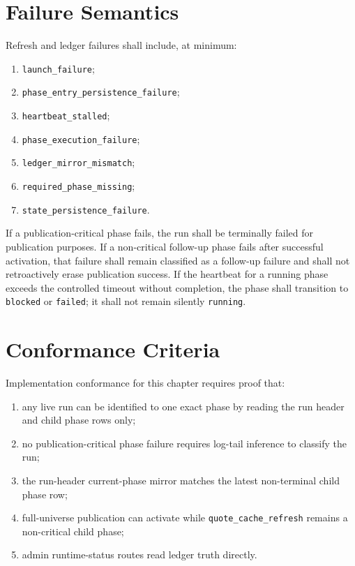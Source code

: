\section{Failure Semantics}
Refresh and ledger failures shall include, at minimum:
\begin{enumerate}[leftmargin=1.2cm]
    \item \texttt{launch\_failure};
    \item \texttt{phase\_entry\_persistence\_failure};
    \item \texttt{heartbeat\_stalled};
    \item \texttt{phase\_execution\_failure};
    \item \texttt{ledger\_mirror\_mismatch};
    \item \texttt{required\_phase\_missing};
    \item \texttt{state\_persistence\_failure}.
\end{enumerate}

If a publication-critical phase fails, the run shall be terminally failed for publication purposes. If a non-critical follow-up phase fails after successful activation, that failure shall remain classified as a follow-up failure and shall not retroactively erase publication success. If the heartbeat for a running phase exceeds the controlled timeout without completion, the phase shall transition to \texttt{blocked} or \texttt{failed}; it shall not remain silently \texttt{running}.

\section{Conformance Criteria}
Implementation conformance for this chapter requires proof that:
\begin{enumerate}[leftmargin=1.2cm]
    \item any live run can be identified to one exact phase by reading the run header and child phase rows only;
    \item no publication-critical phase failure requires log-tail inference to classify the run;
    \item the run-header current-phase mirror matches the latest non-terminal child phase row;
    \item full-universe publication can activate while \texttt{quote\_cache\_refresh} remains a non-critical child phase;
    \item admin runtime-status routes read ledger truth directly.
\end{enumerate}


